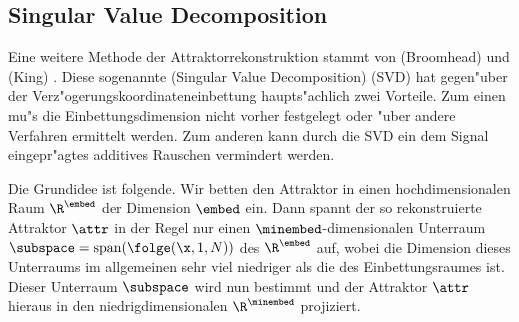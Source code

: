 \subsection{Singular Value Decomposition}
\label{chapsvd}
Eine weitere Methode der Attraktorrekonstruktion stammt von \autor(Broomhead) und
\autor(King) \cite{Broomhead-king}. Diese sogenannte \begriff(Singular Value
Decomposition) (SVD) hat gegen"uber der Verz"ogerungskoordinateneinbettung haupts"achlich
zwei Vorteile. Zum einen mu"s die Einbettungsdimension nicht vorher festgelegt oder "uber
andere Verfahren ermittelt werden. Zum anderen kann durch die SVD ein dem Signal
eingepr"agtes additives Rauschen vermindert werden.

Die Grundidee ist folgende. Wir betten den Attraktor in einen hochdimensionalen Raum
$\R^\embed$ der Dimension $\embed$ ein. Dann spannt der so rekonstruierte Attraktor
$\attr$ in der Regel nur einen $\minembed$-dimensio\-nalen Unterraum
$\subspace=\mathop{\mathrm{span}}(\folge(\x,1,N))$  des
$\R^\embed$ auf, wobei die Dimension dieses Unterraums im allgemeinen sehr viel niedriger
als die des Einbettungsraumes ist.  Dieser Unterraum $\subspace$ wird nun bestimmt und der
Attraktor $\attr$ hieraus in den niedrigdimensionalen $\R^\minembed$ projiziert.

